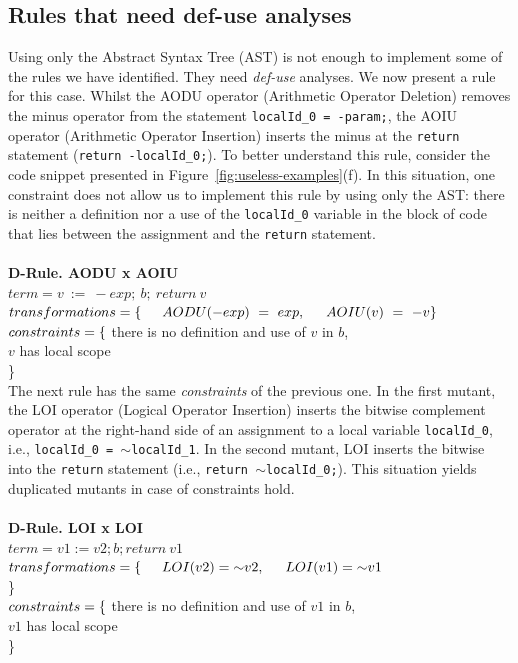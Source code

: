 \subsection{Rules that need def-use analyses}
\label{sec:def-use}

Using only the Abstract Syntax Tree (AST) is not enough to implement some of the rules we have identified. They need \textit{def-use} analyses. We now present a rule for this case. Whilst the AODU operator (Arithmetic Operator Deletion) removes the minus operator from the statement \texttt{localId\_0 = -param;}, the AOIU operator (Arithmetic Operator Insertion) inserts the minus at the \texttt{return} statement (\texttt{return -localId\_0;}). To better understand this rule, consider the code snippet presented in Figure~\ref{fig:useless-examples}(f). In this situation, one constraint does not allow us to implement this rule by using only the AST: there is neither a definition nor a use of the \texttt{localId\_0} variable in the block of code that lies between the assignment and the \texttt{return} statement.
\\
\\
\textbf{D-Rule. AODU x AOIU}\\
$term = v~:=~-exp;~b;~return~v$\\
$transformations = \{ \\ \indent AODU(-exp)~=~exp,\\ \indent AOIU(v)~=~-v \\ \}$\\
$constraints = \{ \\$ 
\indent there is no definition and use of $v$ in $b$, \\ 
\indent $v$ has local scope\\
\}\\
The next rule has the same \textit{constraints} of the previous one. In the first mutant, the LOI operator (Logical Operator Insertion) inserts the bitwise complement operator at the right-hand side of an assignment to a local variable \texttt{localId\_0}, i.e., \texttt{localId\_0 = $\sim$localId\_1}. In the second mutant, LOI inserts the bitwise into the \texttt{return} statement (i.e., \texttt{return $\sim$localId\_0;}). This situation yields duplicated mutants in case of constraints hold.
\\
\\
\textbf{D-Rule. LOI x LOI}\\
$term = v1 := v2; b; return~v1$\\
$transformations = \{\\ \indent LOI(v2) = {\sim} v2,\\ \indent LOI(v1) = {\sim} v1$\\\}\\
$constraints = \{\\$ 
\indent there is no definition and use of $v1$ in $b$, \\
\indent $v1$ has local scope \\
\}

